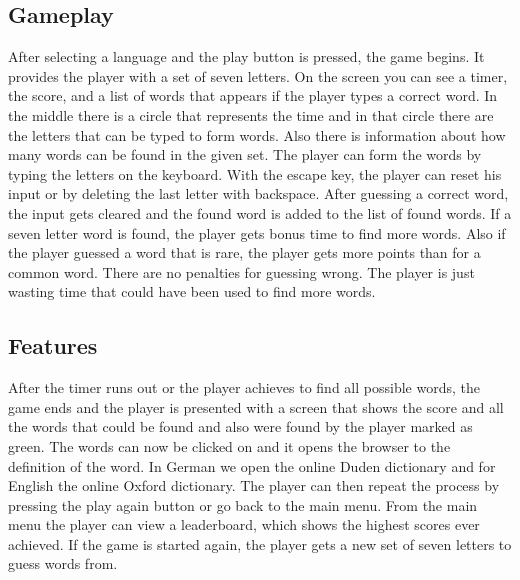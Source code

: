 \documentclass{article}[12pt]
\begin{document}
    \subsection*{Gameplay}

    After selecting a language and the play button is pressed, the game begins.
    It provides the player with a set of seven letters. On the screen you can
    see a timer, the score, and a list of words that appears if the player
    types a correct word. In the middle there is a circle that represents the time and
    in that circle there are the letters that can be typed to form words. Also
    there is information about how many words can be found in the given set.
    The player can form the words by typing the letters on the keyboard. With
    the escape key, the player can reset his input or by deleting the last
    letter with backspace. After guessing a correct word, the input gets
    cleared and the found word is added to the list of found words. If a seven
    letter word is found, the player gets bonus time to find more words. Also
    if the player guessed a word that is rare, the player gets more points than
    for a common word. There are no penalties for guessing wrong. The player is
    just wasting time that could have been used to find more words.

    \subsection*{Features}
    
    After the timer runs out or the player achieves to find all possible words,
    the game ends and the player is presented with a screen that shows the
    score and all the words that could be found and also were found by the
    player marked as green. The words can now be clicked on and it opens the
    browser to the definition of the word. In German we open the online Duden
    dictionary and for English the online Oxford dictionary. The player can
    then repeat the process by pressing the play again button or go back to the
    main menu. From the main menu the player can view a leaderboard, which
    shows the highest scores ever achieved. If the game is started again, the
    player gets a new set of seven letters to guess words from.
\end{document}
